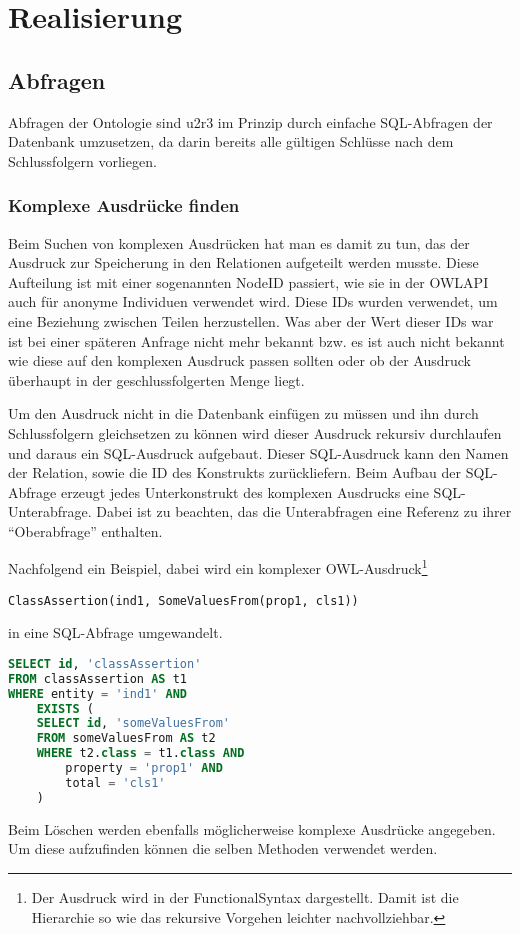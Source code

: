 \chapter{Realisierung}



\section{Abfragen}

Abfragen der Ontologie sind u2r3 im Prinzip durch einfache SQL-Abfragen der Datenbank umzusetzen, da darin bereits alle gültigen Schlüsse nach dem Schlussfolgern vorliegen.

\subsection{Komplexe Ausdrücke finden}
Beim Suchen von komplexen Ausdrücken hat man es damit zu tun, das der Ausdruck zur Speicherung in den Relationen aufgeteilt werden musste. Diese Aufteilung ist mit einer sogenannten NodeID passiert, wie sie in der OWLAPI auch für anonyme Individuen verwendet wird. Diese IDs wurden verwendet, um eine Beziehung zwischen Teilen herzustellen. Was aber der Wert dieser IDs war ist bei einer späteren Anfrage nicht mehr bekannt bzw. es ist auch nicht bekannt wie diese auf den komplexen Ausdruck passen sollten oder ob der Ausdruck überhaupt in der geschlussfolgerten Menge liegt.

Um den Ausdruck nicht in die Datenbank einfügen zu müssen und ihn durch Schlussfolgern gleichsetzen zu können wird dieser Ausdruck rekursiv durchlaufen und daraus ein SQL-Ausdruck aufgebaut. Dieser SQL-Ausdruck kann den Namen der Relation, sowie die ID des Konstrukts zurückliefern. Beim Aufbau der SQL-Abfrage erzeugt jedes Unterkonstrukt des komplexen Ausdrucks eine SQL-Unterabfrage. Dabei ist zu beachten, das die Unterabfragen eine Referenz zu ihrer ``Oberabfrage'' enthalten.

Nachfolgend ein Beispiel, dabei wird ein komplexer OWL-Ausdruck\footnote{Der Ausdruck wird in der FunctionalSyntax dargestellt. Damit ist die Hierarchie so wie das rekursive Vorgehen leichter nachvollziehbar.}

\begin{verbatim}
ClassAssertion(ind1, SomeValuesFrom(prop1, cls1))
\end{verbatim}

in eine SQL-Abfrage umgewandelt.

\begin{lstlisting}[language=SQL]
SELECT id, 'classAssertion'
FROM classAssertion AS t1
WHERE entity = 'ind1' AND
	EXISTS (
	SELECT id, 'someValuesFrom'
	FROM someValuesFrom AS t2
	WHERE t2.class = t1.class AND
		property = 'prop1' AND
		total = 'cls1'
	)
\end{lstlisting}

Beim Löschen werden ebenfalls möglicherweise komplexe Ausdrücke angegeben. Um diese aufzufinden können die selben Methoden verwendet werden.






